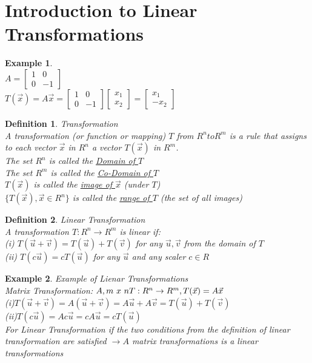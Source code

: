 \documentclass[a4paper,12pt,openany]{book}
\theoremstyle{defn}
\newtheorem{defn}{Definition}[section]
\theoremstyle{expl}
\newtheorem{expl}{Example}[section]
\begin{document}
\section{Introduction to Linear Transformations}
\begin{expl}\-\\
\textup{
$A = \left[\begin{array}{cc}1&0\\0&-1\end{array}\right]$\\
$T(\vec{x})=A\vec{x}=\left[\begin{array}{cc}1&0\\0&-1\end{array}\right]\left[\begin{array}{c}x_1\\x_2\end{array}\right]=\left[\begin{array}{c}x_1\\-x_2\end{array}\right]$\\
}\end{expl}
\begin{defn}
\textup{
Transformation\\
A transformation (or function or mapping) $T$ from $R^n to R^m$ is a rule that assigns to each vector $\vec{x}$ in $R^n$ a vector $T(\vec{x})$ in $R^m$.\\
The set $R^n$ is called the \underline{Domain of $T$}\\
The set $R^m$ is called the \underline{Co-Domain of $T$}\\
$T(\vec{x})$ is called the \underline{image of $\vec{x}$} (under $T$)\\
$\{T(\vec{x}),\vec{x}\in R^n\}$ is called the \underline{range of $T$} (the set of all images)\\
}
\end{defn}
\begin{defn}
\textup{
Linear Transformation\\
A transformation $T: R^n \rightarrow R^m$ is linear if:\\
(i) $T(\vec{u}+\vec{v})=T(\vec{u})+T(\vec{v})$ for any $\vec{u},\vec{v}$ from the domain of $T$\\
(ii) $T(c\vec{u})=cT(\vec{u})$ for any $\vec{u}$ and any scaler $c\in R$\\
}\end{defn}
\begin{expl} 
\textup{
Example of Lienar Transformations\\
Matrix Transformation: $A, m~x~n \\ T:R^n\rightarrow R^m, T(\vec{x})=A\vec{x}$\\
(i)$T(\vec{u}+\vec{v})=A(\vec{u}+\vec{v})=A\vec{u}+A\vec{v}=T(\vec{u})+T(\vec{v})$\\
(ii)$T(c\vec{u})=Ac\vec{u}=cA\vec{u}=cT(\vec{u})$\\
For Linear Transformation if the two conditions from the definition of linear transformation are satisfied $\rightarrow A$ matrix transformations is a linear transformations
}\end{expl}
\end{document}
